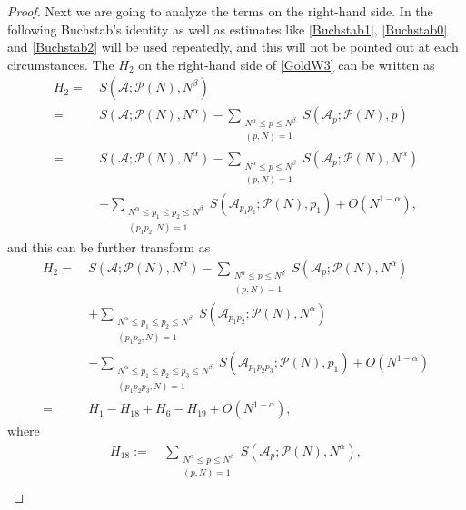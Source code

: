 \documentclass[10pt,a4paper]{amsart}
\def\le{\leqslant}
\begin{document}
\begin{proof}
Next we are going to analyze the terms on the right-hand side. In the following Buchstab's identity as well as 
estimates like \eqref{Buchstab1}, \eqref{Buchstab0} and \eqref{Buchstab2} will be used repeatedly, and this will not be 
pointed out at each circumstances. 
The $H_2$ on the right-hand side of \eqref{GoldW3} can be written as
\begin{equation*}
\begin{split}
H_2=\ &S(\mathscr{A};\mathscr{P}(N),N^\beta)\\
=\ & S(\mathscr{A};\mathscr{P}(N),N^\alpha)-\sum\limits_{\substack{N^\alpha\le p\le N^{\beta} \\(p, N)=1}}S(\mathscr{A}_p ; \mathscr{P}(N), p)\\
=\ & S(\mathscr{A};\mathscr{P}(N),N^\alpha)
-\sum\limits_{\substack{N^\alpha\le p\le N^{\beta} \\(p, N)=1}}S(\mathscr{A}_p; \mathscr{P}(N), N^\alpha) \\ 
&+\sum_{\substack{N^\alpha \le p_1 \le p_2 \le N^\beta \\ (p_1 p_2, N) = 1}}  S(\mathscr{A}_{p_1 p_2}; \mathscr{P}(N), p_1)+O(N^{1-\alpha}), 
\end{split}
\end{equation*}
and this can be further transform as 
\begin{equation}\label{GoldW4}
\begin{split}
H_2=\ & S(\mathscr{A};\mathscr{P}(N),N^\alpha)-\sum\limits_{\substack{N^\alpha\le p\le N^{\beta} \\(p, N)=1}}S(\mathscr{A}_p ; \mathscr{P}(N), N^\alpha)\\
		&+\sum_{\substack{N^\alpha \le p_1 \le p_2 \le N^\beta \\ (p_1 p_2, N) = 1}}  S(\mathscr{A}_{p_1 p_2}; \mathscr{P}(N), N^\alpha)\\
		&-\sum_{\substack{N^\alpha \le p_1 \le p_2 \le p_3\le N^\beta \\ (p_1 p_2 p_3, N) = 1}}  S(\mathscr{A}_{p_1 p_2 p_3}; \mathscr{P}(N), p_1)+O(N^{1-\alpha})\\
=\ &H_1-H_{18}+H_6-H_{19}+O(N^{1-\alpha}),
\end{split}
\end{equation}
where 
\begin{equation}
\begin{split}
H_{18}:=\ &\sum\limits_{\substack{N^\alpha\le p\le N^{\beta} \\(p, N)=1}}S(\mathscr{A}_p ; \mathscr{P}(N), N^\alpha),\\

\end{split}
\end{equation}
\end{proof}
\end{document}
